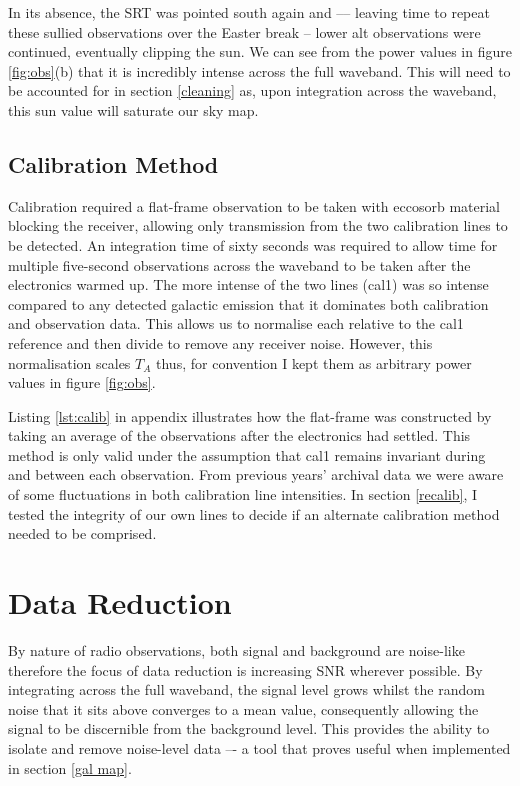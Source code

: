 \documentclass[11pt]{article} %
\begin{document}
In its absence, the SRT was pointed south again and –-- leaving time to repeat these sullied observations over the Easter break -- lower alt observations were continued, eventually clipping the sun. We can see from the power values in figure \ref{fig:obs}(b) that it is incredibly intense across the full waveband. This will need to be accounted for in section \ref{cleaning} as, upon integration across the waveband, this sun value will saturate our sky map.

\subsection{Calibration Method} \label{calib}

Calibration required a flat-frame observation to be taken with eccosorb material blocking the receiver, allowing only transmission from the two calibration lines to be detected. An integration time of sixty seconds was required to allow time for multiple five-second observations across the waveband to be taken after the electronics warmed up. The more intense of the two lines (cal1) was so intense compared to any detected galactic emission that it dominates both calibration and observation data. This allows us to normalise each relative to the cal1 reference and then divide to remove any receiver noise. However, this normalisation scales $T_{A}$ thus, for convention I kept them as arbitrary power values in figure \ref{fig:obs}.

Listing \ref{lst:calib} in appendix illustrates how the flat-frame was constructed by taking an average of the observations after the electronics had settled. This method is only valid under the assumption that cal1 remains invariant during and between each observation. From previous years' archival data we were aware of some fluctuations in both calibration line intensities. In section \ref{recalib}, I tested the integrity of our own lines to decide if an alternate calibration method needed to be comprised.

\section{Data Reduction} \label{data reduction} 

By nature of radio observations, both signal and background are noise-like therefore the focus of data reduction is increasing SNR wherever possible. By integrating across the full waveband, the signal level grows whilst the random noise that it sits above converges to a mean value, consequently allowing the signal to be discernible from the background level. This provides the ability to isolate and remove noise-level data –- a tool that proves useful when implemented in section \ref{gal map}.
\end{document}
